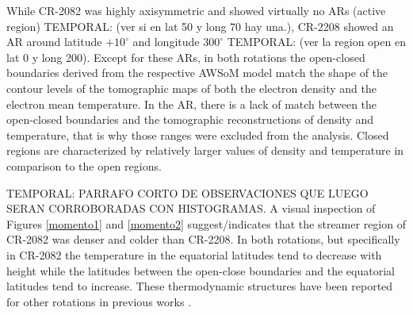 \documentclass[namedreferences]{solarphysics}
\newcommand{\mdeg}{^\circ}
\def\temp#1{\textcolor{mygray}{TEMPORAL: #1}}
\begin{document}
\begin{article}
While CR-2082 was highly axisymmetric and showed virtually no ARs (active region) \temp{(ver si en lat 50 y long 70 hay una.)}, CR-2208 showed an AR around latitude $+10\mdeg$ and longitude $300\mdeg$ \temp{(ver la region open en lat 0 y long 200)}. Except for these ARs, in both rotations the open-closed boundaries derived from the respective AWSoM model match the shape of the contour levels of the tomographic maps of both the electron density and the electron mean temperature. In the AR, there is a lack of match between the open-closed boundaries and the tomographic reconstructions of density and temperature, that is why those ranges were excluded from the analysis. Closed regions are characterized by relatively larger values of density and temperature in comparison to the open regions.

\temp{PARRAFO CORTO DE OBSERVACIONES QUE LUEGO SERAN CORROBORADAS CON HISTOGRAMAS.}
A visual inspection of Figures \ref{momento1} and \ref{momento2} suggest/indicates that the streamer region of CR-2082 was denser and colder than CR-2208. In both rotations, but specifically in CR-2082 the temperature in the equatorial latitudes tend to decrease with height while the latitudes between the open-close boundaries and the equatorial latitudes tend to increase. These thermodynamic structures have been reported for other rotations in previous works \citep{lloveras_2017}.



\end{article}
\end{document}

